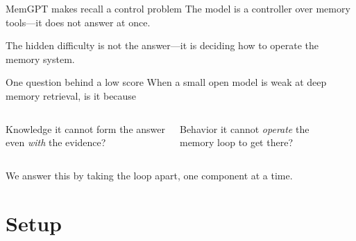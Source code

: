 \documentclass[10pt,aspectratio=169]{beamer}
\newcommand{\code}[1]{{\small\ttfamily #1}}
\begin{document}
\begin{frame}{MemGPT makes recall a control problem}
  The model is a \alert{controller over memory tools}---it does not answer at once.
  \vspace{1.2em}
  \begin{center}
  \end{center}
  \vspace{1.0em}
  The hidden difficulty is not the answer---it is \alert{deciding how to operate
  the memory system}.
\end{frame}

\begin{frame}{One question behind a low score}
  When a small open model is weak at deep memory retrieval, is it because
  \vspace{1.2em}
  \begin{columns}[T,onlytextwidth]
      \begin{block}{Knowledge}
        it cannot form the answer\\ even \emph{with} the evidence?
      \end{block}
      \begin{block}{Behavior}
        it cannot \emph{operate} the\\ memory loop to get there?
      \end{block}
  \end{columns}
  \vspace{1.2em}
  We answer this by taking the loop apart, \alert{one component at a time}.
\end{frame}

\section{Setup}
\end{document}
